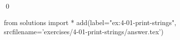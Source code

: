 
\begin{ex}
  \label{ex:4-01-print-strings}
  
  \qed
\end{ex}
\begin{python0}
from solutions import *
add(label="ex:4-01-print-strings",
    srcfilename='exercises/4-01-print-strings/answer.tex')
\end{python0}
